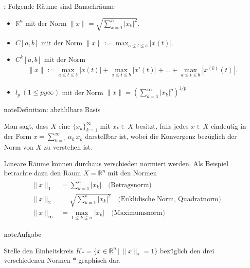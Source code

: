 \documentclass[letterpaper,10pt,english]{jupyterBook}
\begin{document}
: Folgende Räume sind Banachräume
\begin{itemize}
\item {} 
\(\mathbb{R}^n\) mit der Norm \(\|x\| = \sqrt{\sum_{k=1}^n |x_k|^2}\).

\item {} 
\(C[a,b]\) mit der Norm \(\|x\| := \max_{a\le t \le b} |x(t)|\).

\item {} 
\(C^k[a,b]\) mit der Norm
\begin{equation*}
\begin{split}\|x\| := \max_{a\le t \le b} |x(t)| + \max_{a\le t \le b} |x'(t)| + \ldots + \max_{a\le t \le b} |x^{(k)}(t)|.\end{split}
\end{equation*}
\item {} 
\(l_p\ (1\le p y \infty)\) mit der Norm \(\|x\| = \left(\sum_{k=1}^{\infty} |x_k|^p \right)^{1/p}\)

\end{itemize}

\begin{sphinxadmonition}{note}{Definition: abzählbare Basis}

Man sagt, dass \(X\) eine  \(\{x_k\}_{k=1}^{\infty}\) mit \(x_k \in X\) besitzt, falls jedes \(x\in X\) eindeutig in der Form \(x = \sum_{k=1}^{\infty} \alpha_k\,x_k\) darstellbar ist, wobei die Konvergenz bezüglich der Norm von \(X\) zu verstehen ist.
\end{sphinxadmonition}

Lineare Räume können durchaus verschieden normiert werden. Als Beispiel betrachte dazu den Raum \(X=\mathbb{R}^n\) mit den Normen
\begin{equation*}
\begin{split}\begin{split}
\|x\|_1 & = \sum_{k=1}^n |x_k|\quad\text{(Betragsnorm)}\\
\|x\|_2 & = \sqrt{\sum_{k=1}^n |x_k|^2}\quad\text{(Euklidische Norm, Quadratnorm)}\\
\|x\|_{\infty} & = \max_{1\le k \le n} |x_k|\quad\text{(Maximumsnorm)}\end{split}\end{split}
\end{equation*}
\begin{sphinxadmonition}{note}{Aufgabe}

Stelle den Einheitskreis \(K_{*} = \{x\in\mathbb{R}^n\, \big|\, \|x\|_{*} = 1\}\) bezüglich den drei verschiedenen Normen \(*\) graphisch dar.
\end{sphinxadmonition}
\end{document}
